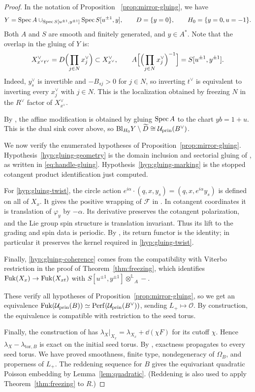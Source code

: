 \documentclass[12pt, letter]{amsart}
\theoremstyle{definition}
\newcommand{\OO}{\mathcal O}
\newcommand{\pr}{\mathrm{prin}}
\newcommand{\otL}{\mathbin{\otimes^{\mathbb L}}}
\numberwithin{equation}{section}
\begin{document}
\begin{proof}
In the notation of Proposition ~\ref{prop:mirror-gluing}, we have
\[
 Y=\operatorname{Spec} A\cup_{\operatorname{Spec} S[u^{\pm1},y^{\pm1}]}
                   \operatorname{Spec} S[u^{\pm1},y],\qquad
 D=\{y=0\},\qquad H_0=\{y=0,u=-1\}.
\]
Both $A$ and $S$ are smooth and finitely generated, and $y\in A^*$.
Note that the overlap in the gluing of $Y$ is:
\[
 X^\vee_{x^\vee t^\vee}
   =D\Bigl(\prod_{j\in N}x_j^\vee\Bigr)
          \subset X^\vee_{x^\vee},\qquad
 A\Bigl[\Bigl(\prod_{j\in N}x_j^\vee\Bigr)^{-1}\Bigr]
   =S[u^{\pm1},y^{\pm1}].
\]
Indeed, $y_s^\vee$ is invertible and $-B_{sj}>0$ for $j\in N$,
so inverting $t^\vee$ is equivalent to inverting every
$x_j^\vee$ with $j\in N$.
This is the localization obtained by freezing $N$ in the $R^\vee$
factor of $X^\vee_{x^\vee}$.


By \cite[Lemma~5.2]{HS}, the affine modification is obtained by
gluing $\operatorname{Spec} A$ to the chart $yb=1+u$. This is the dual sink
cover above, so $\Bl_{H_0}Y\setminus\widetilde D\cong \cU_{\pr}(B^\vee)$.

We now verify the enumerated hypotheses of Proposition~\ref{prop:mirror-gluing}.
Hypothesis~\ref{hyp:gluing-geometry} is the domain inclusion and
sectorial gluing of \cite[Proposition~4.9(vi)]{HS}, as written in
\eqref{eq:handle-gluing}.
Hypothesis~\ref{hyp:gluing-marking} is the stopped cotangent
product identification just computed.

For \ref{hyp:gluing-twist}, the circle action
$e^{i\alpha}\cdot(q,x,y_s)=(q,x,e^{i\alpha}y_s)$ is defined on
all of $X_x$. It gives the positive wrapping of $\mathcal F$
in \cite[Proposition~4.9(vi)]{HS}.
In cotangent coordinates it is translation of
$\varphi_y$ by $-\alpha$. Its derivative preserves the cotangent
polarization, and the Lie group spin structure is translation
invariant. Thus its lift to the grading and spin data is periodic.
By \cite[Lemma~2.2]{HS}, its return functor is the identity;
in particular it preserves the kernel required in
\ref{hyp:gluing-twist}.


Finally, \ref{hyp:gluing-coherence}
comes from the compatibility with Viterbo restriction in the proof of  Theorem~\ref{thm:freezing}, which identifies
$
 \operatorname{Fuk}(X_x)\to\operatorname{Fuk}(X_{xt})$ with 
 $S[u^{\pm1},y^{\pm1}]\otL_A-$.
 
These verify all hypotheses of Proposition~\ref{prop:mirror-gluing}, so we get an equivalence
$\Fuk(\cU_{\pr}(B))\simeq\Perf(\cU_{\pr}(B^\vee))$, sending $L_+ \mapsto \OO$.  By construction, the equivalence is compatible with restriction to the seed torus.


Finally, the construction of \cite[Proposition~4.9]{HS} has
$\lambda_X|_{X_x}=\lambda_{X_x}+\dd(\chi F)$ for its cutoff
$\chi$. Hence $\lambda_X-\lambda_{\mathrm{tor},B}$ is exact on
the initial seed torus. By \cite[Lemma~4.13]{HS}, exactness
propagates to every seed torus.
We have proved smoothness, finite type, nondegeneracy of
$\Omega_B$, and properness of $L_+$.
The reddening sequence for $B$ gives the equivariant quadratic
Poisson embedding by Lemma~\ref{lem:quadratic}. (Reddening is also used  to apply Theorem~\ref{thm:freezing} to $R$.)


\end{proof}
\end{document}
